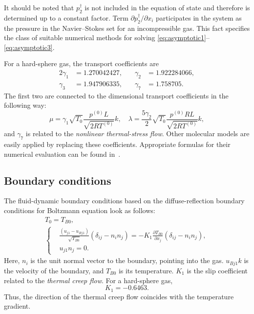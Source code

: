 \documentclass[smallextended, referee]{svjour3} %
\newcommand{\pder}[2][]{\frac{\partial#1}{\partial#2}}
\newcommand{\Pder}[2][]{\partial#1/\partial#2}
\begin{document}
It should be noted that \(p_2^\dag\) is not included in the equation of state and
therefore is determined up to a constant factor.
Term \(\Pder[p_2^\dag]{x_i}\) participates in the system as the pressure
in the Navier--Stokes set for an incompressible gas.
This fact specifies the class of suitable numerical methods
for solving \eqref{eq:asymptotic1}--\eqref{eq:asymptotic3}.

For a hard-sphere gas, the transport coefficients are
\begin{alignat*}{2}
    \gamma_1 &= 1.270042427, &\quad \gamma_2 &= 1.922284066, \\
    \gamma_3 &= 1.947906335, &\quad \gamma_7 &= 1.758705.
\end{alignat*}
The first two are connected to the dimensional transport coefficients in the following way:
\begin{equation}
    \mu = \gamma_1\sqrt{T_0} \frac{p^{(0)}L}{\sqrt{2RT^{(0)}}} k, \quad
    \lambda = \frac{5\gamma_2}{2}\sqrt{T_0} \frac{p^{(0)}RL}{\sqrt{2RT^{(0)}}} k,
\end{equation}
and \(\gamma_7\) is related to the \emph{nonlinear thermal-stress flow}.
Other molecular models are easily applied by replacing these coefficients.
Appropriate formulas for their numerical evaluation can be found in~\cite{SoneBobylev96, Sone2002, Sone2007}.

\subsection{Boundary conditions}

The fluid-dynamic boundary conditions based on the diffuse-reflection boundary conditions
for Boltzmann equation look as follows:
\begin{gather}
    T_0 = T_{B0}, \label{eq:bound:T} \\
    \left\{
    \begin{aligned}
        & \frac{(u_{j1}-u_{Bj1})}{\sqrt{T_{B0}}}(\delta_{ij}-n_in_j) =
            -K_1\pder[T_{B0}]{x_j}(\delta_{ij}-n_in_j), \\
        & u_{j1}n_j = 0.
    \end{aligned}
    \right. \label{eq:bound:v}
\end{gather}
Here, \(n_i\) is the unit normal vector to the boundary, pointing into the gas.
\(u_{Bj1}k\) is the velocity of the boundary, and \(T_{B0}\) is its temperature.
\(K_1\) is the slip coefficient related to the \emph{thermal creep flow}.
For a hard-sphere gas, \[ K_1 = -0.6463. \]
Thus, the direction of the thermal creep flow coincides with the temperature gradient.
\end{document}
